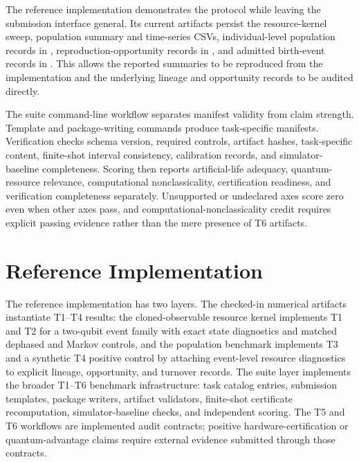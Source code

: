 \documentclass[11pt]{article}
\begin{document}
The reference implementation demonstrates the protocol while leaving the submission interface general. Its current artifacts persist the resource-kernel sweep, population summary and time-series CSVs, individual-level population records in , reproduction-opportunity records in , and admitted birth-event records in . This allows the reported summaries to be reproduced from the implementation and the underlying lineage and opportunity records to be audited directly.

The suite command-line workflow separates manifest validity from claim strength. Template and package-writing commands produce task-specific manifests. Verification checks schema version, required controls, artifact hashes, task-specific content, finite-shot interval consistency, calibration records, and simulator-baseline completeness. Scoring then reports artificial-life adequacy, quantum-resource relevance, computational nonclassicality, certification readiness, and verification completeness separately. Unsupported or undeclared axes score zero even when other axes pass, and computational-nonclassicality credit requires explicit passing evidence rather than the mere presence of T6 artifacts.

\FloatBarrier

\section{Reference Implementation}

The reference implementation has two layers. The checked-in numerical artifacts instantiate T1--T4 results: the cloned-observable resource kernel implements T1 and T2 for a two-qubit event family with exact state diagnostics and matched dephased and Markov controls, and the population benchmark implements T3 and a synthetic T4 positive control by attaching event-level resource diagnostics to explicit lineage, opportunity, and turnover records. The suite layer implements the broader T1--T6 benchmark infrastructure: task catalog entries, submission templates, package writers, artifact validators, finite-shot certificate recomputation, simulator-baseline checks, and independent scoring. The T5 and T6 workflows are implemented audit contracts; positive hardware-certification or quantum-advantage claims require external evidence submitted through those contracts.
\end{document}
